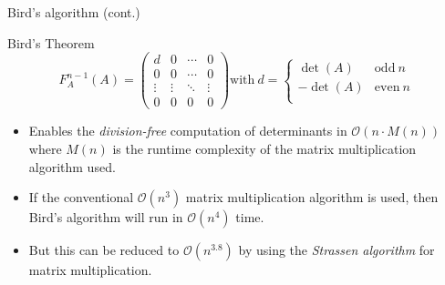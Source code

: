 \documentclass{beamer}
\begin{document}
\begin{frame}{Bird's algorithm (cont.)}

    \begin{block}{Bird's Theorem}
        \[
            F_A^{n-1}(A) =
            \begin{pmatrix}{}
                d      & 0      & \cdots & 0 \\
                0      & 0      & \cdots & 0 \\
                \vdots & \vdots & \ddots & \vdots \\
                0      & 0      & 0      & 0
            \end{pmatrix}
            \text{with} \ d =
            \begin{cases}{}
                \det(A)  & \text{odd} \ n \\
                -\det(A) & \text{even} \ n \\
            \end{cases}
        \]
    \end{block}

    \begin{itemize}

        \item Enables the \emph{division-free} computation of determinants in
            $\mathcal{O}(n\cdot M(n))$ where $M(n)$ is the runtime complexity of the matrix
            multiplication algorithm used.

        \item If the conventional $\mathcal{O}(n^3)$ matrix multiplication algorithm is used,
            then Bird's algorithm will run in $\mathcal{O}(n^4)$ time.

        \item But this can be reduced to $\mathcal{O}(n^{3.8})$ by using the
            \emph{Strassen algorithm} for matrix multiplication.

    \end{itemize}

\end{frame}
\end{document}
